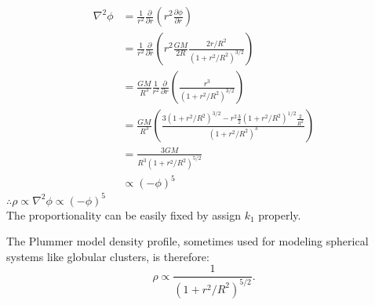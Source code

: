 \begin{enumerate}
\begin{enumerate}
\begin{answer}
\begin{align*}
    \nabla ^2 \phi &= \frac{1}{r^2}\frac{\partial}{\partial r}(r^2 \frac{\partial \phi}{\partial r})\\
    & = \frac{1}{r^2}\frac{\partial}{\partial r}(r^2 \frac{GM}{2R}\frac{2r/R^2}{(1+r^2/R^2)^{3/2}})\\
    &= \frac{GM}{R^3}\frac{1}{r^2}\frac{\partial}{\partial r}(\frac{r^3}{(1+r^2/R^2)^{3/2}}) \\
    &= \frac{GM}{R^3}(\frac{3(1+r^2/R^2)^{3/2}-r^2 \frac{3}{2} (1+r^2/R^2)^{1/2}\frac{2}{R^2}}{(1+r^2/R^2)^3})\\
    &= \frac{3GM}{R^3(1+r^2/R^2)^{5/2}} \\
    & \propto (-\phi)^5
\end{align*}
$\therefore \rho \propto \nabla ^2 \phi \propto (-\phi)^5 $
\\
The proportionality can be easily fixed by assign $k_1$ properly.

The Plummer model density profile, sometimes used for modeling
spherical systems like globular clusters, is therefore:
\begin{equation}
\rho \propto \frac{1}{\left(1 + r^2/R^2\right)^{5/2}}.
\end{equation}
\end{answer}


\end{enumerate}
\end{enumerate}
